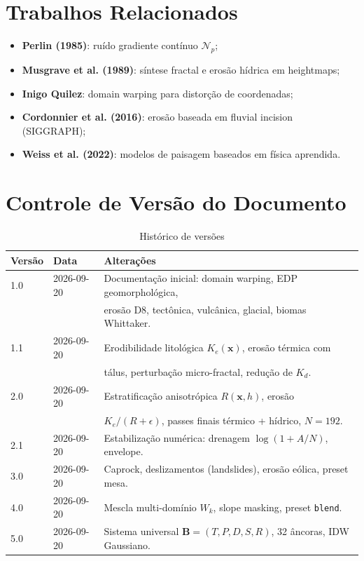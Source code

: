 \documentclass[11pt,a4paper]{article}
\begin{document}
\section{Trabalhos Relacionados}

\begin{itemize}
  \item \textbf{Perlin (1985)}: ruído gradiente contínuo $\mathcal{N}_p$;
  \item \textbf{Musgrave et al. (1989)}: síntese fractal e erosão hídrica em heightmaps;
  \item \textbf{Inigo Quilez}: domain warping para distorção de coordenadas;
  \item \textbf{Cordonnier et al. (2016)}: erosão baseada em fluvial incision (SIGGRAPH);
  \item \textbf{Weiss et al. (2022)}: modelos de paisagem baseados em física aprendida.
\end{itemize}

\section{Controle de Versão do Documento}

\begin{table}[H]
\centering
\caption{Histórico de versões}
\label{tab:versions}
\begin{tabular}{@{}lll@{}}
\toprule
\textbf{Versão} & \textbf{Data} & \textbf{Alterações} \\
\midrule
1.0 & 2026-09-20 & Documentação inicial: domain warping, EDP geomorphológica, \\
    &            & erosão D8, tectônica, vulcânica, glacial, biomas Whittaker. \\
1.1 & 2026-09-20 & Erodibilidade litológica $K_e(\mathbf{x})$, erosão térmica com \\
    &            & tálus, perturbação micro-fractal, redução de $K_d$. \\
2.0 & 2026-09-20 & Estratificação anisotrópica $R(\mathbf{x},h)$, erosão \\
    &            & $K_e/(R+\epsilon)$, passes finais térmico + hídrico, $N=192$. \\
2.1 & 2026-09-20 & Estabilização numérica: drenagem $\log(1+A/N)$, envelope. \\
3.0 & 2026-09-20 & Caprock, deslizamentos (landslides), erosão eólica, preset mesa. \\
4.0 & 2026-09-20 & Mescla multi-domínio $W_k$, slope masking, preset \texttt{blend}. \\
5.0 & 2026-09-20 & Sistema universal $\mathbf{B}=(T,P,D,S,R)$, 32 âncoras, IDW Gaussiano. \\
\bottomrule
\end{tabular}
\end{table}
\end{document}

